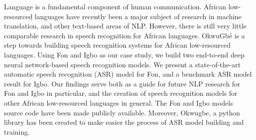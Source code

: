 Language is a fundamental component of human communication. African low-resourced languages have recently been a major subject of research in machine translation, and other text-based areas of NLP. However, there is still very little comparable research in speech recognition for African languages. OkwuGbé is a step towards building speech recognition systems for African low-resourced languages. Using Fon and Igbo as our case study, we build two end-to-end deep neural network-based speech recognition models. We present a state-of-the-art automatic speech recognition (ASR) model for Fon, and a benchmark ASR model result for Igbo. Our findings serve both as a guide for future NLP research for Fon and Igbo in particular, and the creation of speech recognition models for other African low-resourced languages in general. The Fon and Igbo models source code have been made publicly available. Moreover, Okwugbe, a python library has been created to make easier the process of ASR model building and training.
